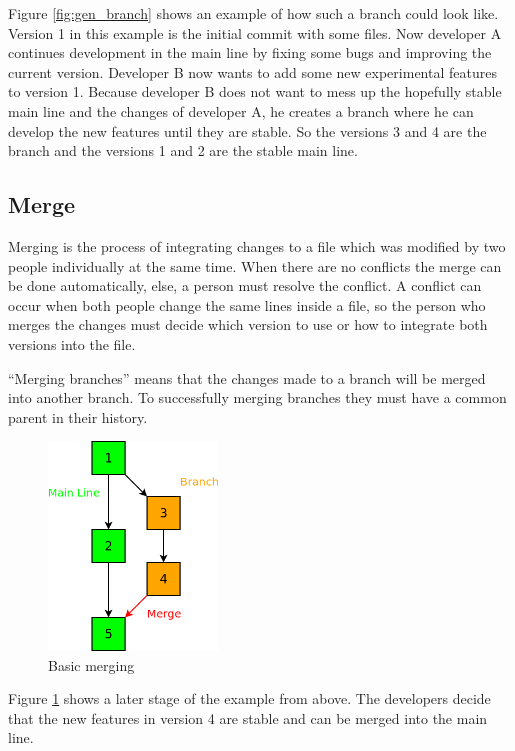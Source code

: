 Figure \ref{fig:gen_branch} shows an example of how such a branch could look like. Version 1 in 
this example is the initial commit with some files. Now developer A continues development in the main line by fixing 
some bugs and improving the current version. Developer B now wants to add some new experimental 
features to version 1. Because developer B does not want to mess up the hopefully stable main line and the 
changes of developer A, he creates a branch where he can develop the new features until they are stable. 
So the versions 3 and 4 are the branch and the versions 1 and 2 are the stable main line.


\subsection{Merge}

Merging is the process of integrating changes to a file which was modified by two people individually 
at the same time. When there are no conflicts the merge can be done automatically, else, a person must resolve 
the conflict. A conflict can occur when both people change the same lines inside a file, so the person who 
merges the changes must decide which version to use or how to integrate both versions into the file.

“Merging branches” means that the changes made to a branch will be merged into another branch. 
To successfully merging branches they must have a common parent in their history.

\begin{figure}[ht]
  \centering
  \includegraphics[width=0.4\textwidth]{img/Gen_Merge}
  \caption{Basic merging}
  \label{fig:gen_merge} 
\end{figure}

Figure \ref{fig:gen_merge} shows a later stage of the example from above. The developers decide that 
the new features in version 4 are stable and can be merged into the main line.


